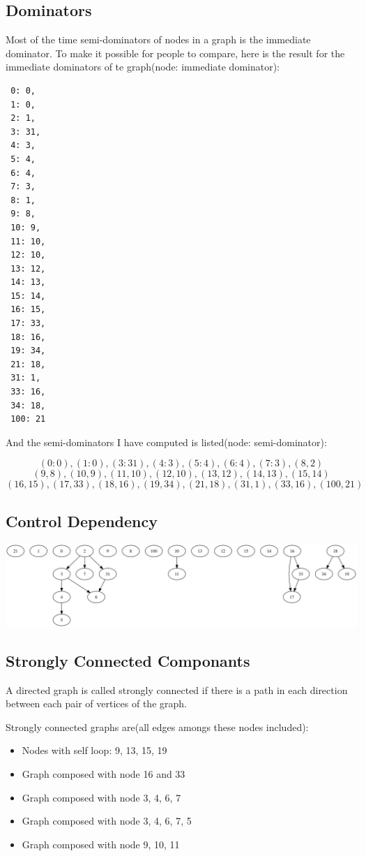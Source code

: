 \documentclass[12pt]{article}
\begin{document}
\subsection{Dominators}
Most of the time semi-dominators of nodes in a graph is the immediate
dominator. To make it possible for people to compare, here is the result
for the immediate dominators of te graph(node: immediate dominator):
\begin{verbatim}
 0: 0,
 1: 0,
 2: 1,
 3: 31,
 4: 3,
 5: 4,
 6: 4,
 7: 3,
 8: 1,
 9: 8,
 10: 9,
 11: 10,
 12: 10,
 13: 12,
 14: 13,
 15: 14,
 16: 15,
 17: 33,
 18: 16,
 19: 34,
 21: 18,
 31: 1,
 33: 16,
 34: 18,
 100: 21
\end{verbatim}

And the semi-dominators I have computed is listed(node: semi-dominator):

$$ (0: 0), (1: 0), (3: 31), (4: 3), (5: 4), (6: 4), (7: 3), (8, 2)$$
$$ (9, 8), (10, 9), (11, 10), (12, 10), (13, 12), (14, 13), (15, 14)$$
$$ (16, 15), (17, 33), (18, 16), (19, 34), (21, 18), (31, 1), (33,
16), (100, 21)$$

\subsection{Control Dependency}
\includegraphics[scale=0.3]{cdg.jpg}

\subsection{Strongly Connected Componants}
A directed graph is called strongly connected if there is a path in
each direction between each pair of vertices of the graph.

Strongly connected graphs are(all edges amongs these nodes included):
\begin{itemize}
\item Nodes with self loop: 9, 13, 15, 19
\item Graph composed with node 16 and 33
\item Graph composed with node 3, 4, 6, 7
\item Graph composed with node 3, 4, 6, 7, 5
\item Graph composed with node 9, 10, 11
\end{itemize}
\end{document}
